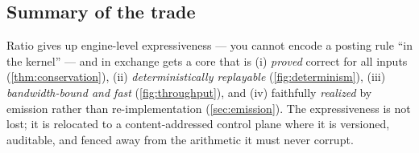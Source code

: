 \subsection{Summary of the trade}

Ratio gives up engine-level expressiveness --- you cannot encode a
posting rule ``in the kernel'' --- and in exchange gets a core that is
(i) \emph{proved} correct for all inputs (\cref{thm:conservation}),
(ii) \emph{deterministically replayable} (\cref{fig:determinism}),
(iii) \emph{bandwidth-bound and fast} (\cref{fig:throughput}), and
(iv) faithfully \emph{realized} by emission rather than re-implementation
(\cref{sec:emission}). The expressiveness is not lost; it is relocated to
a content-addressed control plane where it is versioned, auditable, and
fenced away from the arithmetic it must never corrupt.



